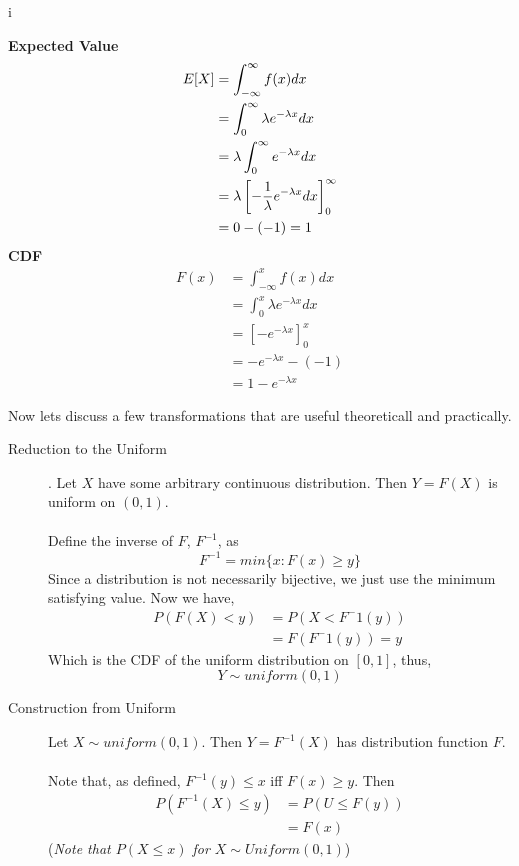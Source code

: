 i\documentclass[10pt]{article}
\begin{document}
\begin{description}
        \textbf{Expected Value} 
        \begin{align*}
            E[X] &= \int_{-\infty}^{\infty} f(x)dx \\ 
                 &= \int_0^{\infty} \lambda e^{-\lambda x}dx \\ 
                 &= \lambda \int_0^{\infty} e^{-\lambda x}dx \\
                 &= \lambda \left[ - \frac{1}{\lambda} e^{-\lambda x}dx \right]_0^{\infty} \\
                 &= 0 - (-1) = 1
        \end{align*}
        \textbf{CDF} 
        \begin{align*}
            F(x) &= \int_{-\infty}^{x} f(x)dx \\
                 &= \int_0^x \lambda e^{- \lambda x} dx \\
                 &=  \left[ - e^{- \lambda x} \right]_0^x \\
                 &= - e^{- \lambda x} - (-1) \\
                 &= 1 - e^{- \lambda x}
        \end{align*}
    \newpage
\end{description}
\par
Now lets discuss a few transformations that are useful theoreticall and practically.
\begin{description}
    \item[Reduction to the Uniform]. Let $X$ have some arbitrary continuous distribution. Then 
        $ Y = F(X)$ is uniform on $(0,1)$.
        \\\\
        Define the inverse of $F$, $F^{-1}$, as
        \[ F^{-1} = min\{x: F(x) \geq y\} \]
        Since a distribution is not necessarily bijective, we just use the minimum satisfying value.
        Now we have,
        \begin{align*}
            P(F(X) < y) &= P(X < F^-1(y)) \\
                        &= F(F^-1(y)) = y
        \end{align*}
        Which is the CDF of the uniform distribution on $[0,1]$, thus, 
        \[Y \sim uniform(0,1)\]
    \item[Construction from Uniform] Let $X \sim uniform(0,1)$. Then $Y = F^{-1}(X)$ has distribution
        function $F$.
        \\\\
        Note that, as defined, $F^{-1}(y) \leq x$ iff $F(x) \geq y$. Then
        \begin{align*}
            P(F^{-1}(X) \leq y) &= P(U \leq F(y)) \\
                                &= F(x)
        \end{align*}
        (\textit{Note that $P(X \leq x)$ for $X \sim Uniform(0,1)$})
\end{description}
\end{document}
